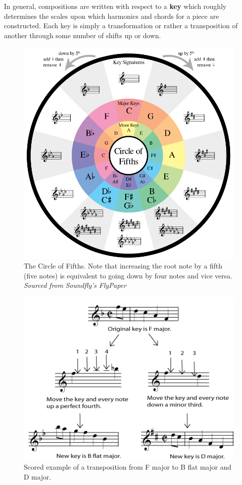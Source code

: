 \documentclass[12pt,]{article}
\begin{document}
In general, compositions are written with respect to a \textbf{key}
which roughly determines the scales upon which harmonics and chords for
a piece are constructed. Each key is simply a transformation or rather a
transposition of another through some number of shifts up or down.

\begin{figure}
\centering
\includegraphics[width=\textwidth,height=0.4\textheight]{Images/flypaperfifths.png}
\caption{The Circle of Fifths. Note that increasing the root note by a
fifth (five notes) is equivalent to going down by four notes and vice
versa. \newline\textit{Sourced from Soundfly's FlyPaper}}
\end{figure}

\begin{figure}
\centering
\includegraphics[width=\textwidth,height=0.3\textheight]{Images/transp3b.png}
\caption{Scored example of a transposition from F major to B flat major
and D major.}
\end{figure}
\end{document}
